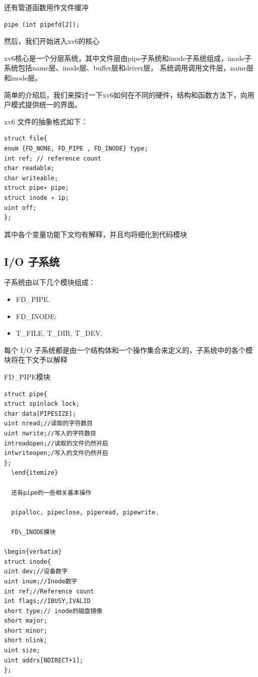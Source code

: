 还有管道函数用作文件缓冲

\begin{verbatim}
pipe (int pipefd[2]);
\end{verbatim}

然后，我们开始进入xv6的核心

xv6核心是一个分层系统，其中文件层由pipe子系统和inode子系统组成，inode子系统包括name层、inode层、buffer层和driver层， 系统调用调用文件层，name层和inode层。

简单的介绍后，我们来探讨一下xv6如何在不同的硬件，结构和函数方法下，向用户模式提供统一的界面。

xv6 文件的抽象格式如下：

\begin{verbatim}
struct file{
enum {FD_NONE, FD_PIPE , FD_INODE} type;
int ref; // reference count
char readable;
char writeable;
struct pipe∗ pipe;
struct inode ∗ ip;
uint off;
};
\end{verbatim}

其中各个变量功能下文均有解释，并且均将细化到代码模块

\subsection{I/O 子系统}

子系统由以下几个模块组成：

\begin{itemize}
\item FD\_PIPE.
\item FD\_INODE:
\item T\_FILE, T\_DIR, T\_DEV.
\end{itemize}

每个 I/O 子系统都是由一个结构体和一个操作集合来定义的，子系统中的各个模块将在下文予以解释

  FD\_PIPE模块

  \begin{verbatim}
struct pipe{
struct spinlock lock;
char data[PIPESIZE];
uint nread;//读取的字符数目
uint nwrite;//写入的字符数目
intreadopen;//读取的文件仍然开启
intwriteopen;/写入的文件仍然开启
};
  \end{itemize}

  还有pipe的一些相关基本操作

  pipalloc, pipeclose, piperead, pipewrite.

  FD\_INODE模块

\begin{verbatim}
struct inode{
uint dev;//设备数字
uint inum;//Inode数字
int ref;//Reference count
int flags;//IBUSY,IVALID
short type;// inode的磁盘镜像
short major;
short minor;
short nlink;
uint size;
uint addrs[NDIRECT+1];
};
\end{verbatim}

